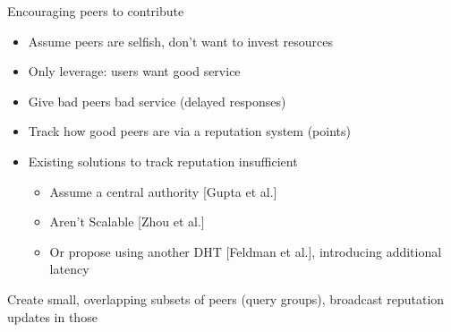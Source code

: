 \documentclass[presentation,english,usenames,dvipsnames]{beamer}
\begin{document}
\begin{frame}{Encouraging peers to contribute}
  \begin{itemize}
    \item Assume peers are selfish, don't want to invest resources
    \item Only leverage: users want good service
    \item Give bad peers bad service (delayed responses)

    \pause

    \item Track how good peers are via a reputation system (points)
    \item Existing solutions to track reputation insufficient
    \begin{itemize}
      \item Assume a central authority {\color{gray}\tiny[Gupta et al.]}
      \item Aren't Scalable {\color{gray}\tiny[Zhou et al.]}
      \item Or propose using another DHT {\color{gray}\tiny[Feldman et al.]},
            introducing additional latency
    \end{itemize}

    \pause

  \end{itemize}
  \begin{block}{}
    Create small, overlapping subsets of peers (query groups), broadcast
    reputation updates in those
  \end{block}
\end{frame}
\end{document}
